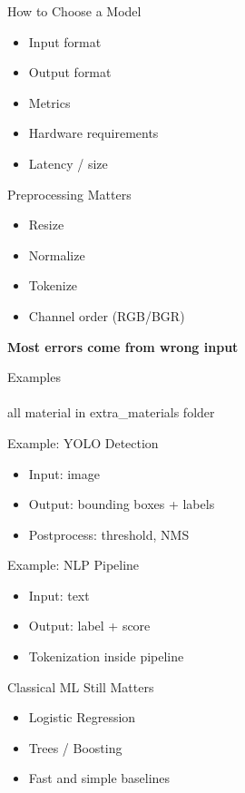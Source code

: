 \documentclass[aspectratio=169]{beamer}
\begin{document}
\begin{frame}[t]{How to Choose a Model}
\begin{itemize}
\item Input format
\item Output format
\item Metrics
\item Hardware requirements
\item Latency / size
\end{itemize}
\end{frame}



\begin{frame}[t]{Preprocessing Matters}
\begin{itemize}
\item Resize
\item Normalize
\item Tokenize
\item Channel order (RGB/BGR)
\end{itemize}

\textbf{Most errors come from wrong input}
\end{frame}

\begin{frame}{Examples}
\framesubtitle{}
    \Large all material in extra\_materials folder
\end{frame}

\begin{frame}[t]{Example: YOLO Detection}
\begin{itemize}
\item Input: image
\item Output: bounding boxes + labels
\item Postprocess: threshold, NMS
\end{itemize}
\end{frame}



\begin{frame}[t]{Example: NLP Pipeline}
\begin{itemize}
\item Input: text
\item Output: label + score
\item Tokenization inside pipeline
\end{itemize}
\end{frame}



\begin{frame}[t]{Classical ML Still Matters}
\begin{itemize}
\item Logistic Regression
\item Trees / Boosting
\item Fast and simple baselines
\end{itemize}
\end{frame}
\end{document}
